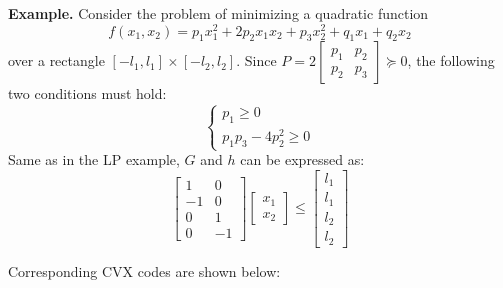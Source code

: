 \documentclass[
]{book}
\theoremstyle{definition}
\theoremstyle{definition}
\theoremstyle{definition}
\theoremstyle{definition}
\theoremstyle{remark}
\begin{document}
\textbf{Example.} Consider the problem of minimizing a quadratic function
\begin{equation*}
   f(x_1, x_2) = p_1 x_1^2 + 2p_2 x_1 x_2 + p_3 x_2^2 + q_1 x_1 + q_2 x_2
\end{equation*}
over a rectangle \([-l_1, l_1] \times [-l_2, l_2]\). Since \(P = 2 \begin{bmatrix}
   p_1 & p_2 \\ p_2 & p_3
\end{bmatrix} \succeq 0\), the following two conditions must hold:
\begin{equation*}
   \begin{cases}
      p_1 \ge 0 \\
      p_1 p_3 - 4 p_2^2 \ge 0
   \end{cases}
\end{equation*}
Same as in the LP example, \(G\) and \(h\) can be expressed as:
\begin{equation*}
   \begin{bmatrix}
      1 & 0 \\ -1 & 0 \\ 0 & 1 \\ 0 & -1
   \end{bmatrix} \begin{bmatrix}
      x_1 \\ x_2
   \end{bmatrix} \le \begin{bmatrix}
      l_1 \\ l_1 \\ l_2 \\ l_2
   \end{bmatrix}
\end{equation*}

Corresponding CVX codes are shown below:
\end{document}

